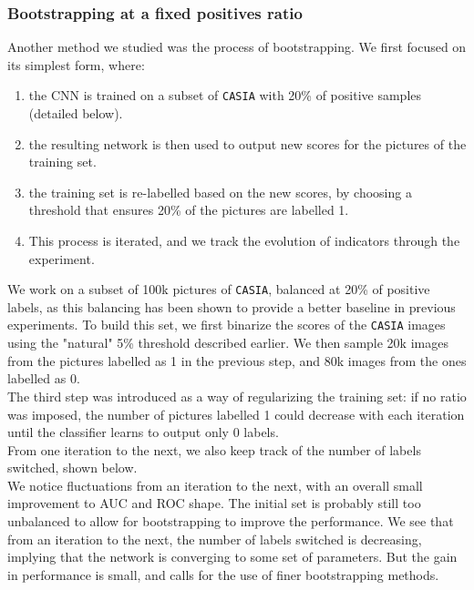 \documentclass[a4paper]{article}
\begin{document}
        \subsubsection{Bootstrapping at a fixed positives ratio}\label{strap1} %
            Another method we studied was the process of bootstrapping. We first focused on its simplest form, where: 
            \begin{enumerate}
            	\item the CNN is trained on a subset of \texttt{CASIA} with 20\% of positive samples (detailed below). %
            	\item the resulting network is then used to output new scores for the pictures of the training set.
            	\item the training set is re-labelled based on the new scores, by choosing a threshold that ensures 20\% of the pictures are labelled 1.
            	\item This process is iterated, and we track the evolution of indicators through the experiment.
            \end{enumerate}
             We work on a subset of 100k pictures of \texttt{CASIA}, balanced at 20\% of positive labels, as this balancing has been shown to provide a better baseline in previous experiments. To build this set, we first binarize the scores of the \texttt{CASIA} images using the "natural" 5\% threshold described earlier. We then sample 20k images from the pictures labelled as 1 in the previous step, and 80k images from the ones labelled as 0.\\
            The third step was introduced as a way of regularizing the training set: if no ratio was imposed, the number of pictures labelled 1 could decrease with each iteration until the classifier learns to output only 0 labels.\\
            From one iteration to the next, we also keep track of the number of labels switched, shown below.\\
           We notice fluctuations from an iteration to the next, with an overall small improvement to AUC and ROC shape. The initial set is probably still too unbalanced to allow for bootstrapping to improve the performance. We see that from an iteration to the next, the number of labels switched is decreasing, implying that the network is converging to some set of parameters. But the gain in performance is small, and calls for the use of finer bootstrapping methods.
                 
\end{document}

